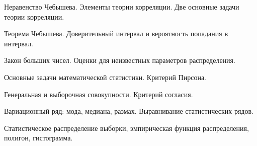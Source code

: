 \documentclass[
	14pt,
	a4paper,
	]
	{scrartcl}
\begin{document}
\vfill

\newpage


\shapk
{}
\setcounter{zad}{0}

\vfill
\z Неравенство Чебышева.
 \vfill
\z Элементы теории корреляции. Две основные задачи теории корреляции.
 \vfill

\vfill

\newpage


\shapk
{}
\setcounter{zad}{0}

\vfill
\z Теорема Чебышева.
 \vfill
\z Доверительный интервал и вероятность попадания в интервал.
 \vfill

\vfill

\newpage


\shapk
{}
\setcounter{zad}{0}

\vfill
\z Закон больших чисел.
 \vfill
\z Оценки для неизвестных параметров распределения.
 \vfill

\vfill

\newpage


\shapk
{}
\setcounter{zad}{0}

\vfill
\z Основные задачи математической статистики.
 \vfill
\z Критерий Пирсона.
 \vfill

\vfill

\newpage


\shapk
{}
\setcounter{zad}{0}

\vfill
\z Генеральная и выборочная совокупности.
 \vfill
\z Критерий согласия.
 \vfill

\vfill

\newpage


\shapk
{}
\setcounter{zad}{0}

\vfill
\z Вариационный ряд: мода, медиана, размах. 
 \vfill
\z Выравнивание статистических рядов.
 \vfill

\vfill

\newpage


\shapk
{}
\setcounter{zad}{0}

\vfill
\z Статистическое распределение выборки, эмпирическая функция распределения,
 \vfill
\z полигон, гистограмма.
 \vfill

\vfill

\newpage
\end{document}
